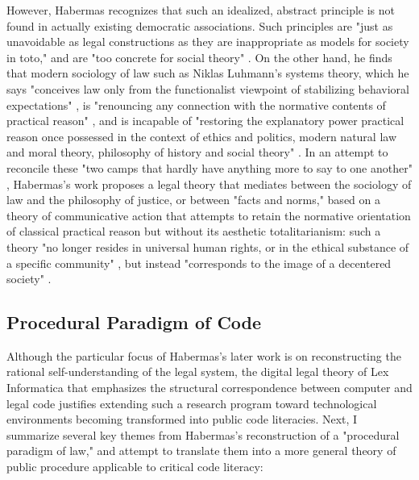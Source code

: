 However, Habermas recognizes that such an idealized, abstract principle is not found in actually existing democratic associations. Such principles are "just as unavoidable as legal constructions as they are inappropriate as models for society in toto," and are "too concrete for social theory" \autocite[80]{Habermas-bfn}. On the other hand, he finds that modern sociology of law such as Niklas Luhmann's systems theory, which he says "conceives law only from the functionalist viewpoint of stabilizing behavioral expectations" \autocite[48]{Habermas-bfn}, is "renouncing any connection with the normative contents of practical reason" \autocite[2]{Habermas-bfn}, and is incapable of "restoring the explanatory power practical reason once possessed in the context of ethics and politics, modern natural law and moral theory, philosophy of history and social theory" \autocite[2]{Habermas-bfn}. In an attempt to reconcile these "two camps that hardly have anything more to say to one another" \autocite[6]{Habermas-bfn}, Habermas's work proposes a legal theory that mediates between the sociology of law and the philosophy of justice, or between "facts and norms," based on a theory of communicative action that attempts to retain the normative orientation of classical practical reason but without its aesthetic totalitarianism: such a theory "no longer resides in universal human rights, or in the ethical substance of a specific community" \autocite[296]{Habermas-bfn}, but instead "corresponds to the image of a decentered society" \autocite[301]{Habermas-bfn}.

\subsection*{Procedural Paradigm of Code}
Although the particular focus of Habermas's later work is on reconstructing the rational self-understanding of the legal system, the digital legal theory of Lex Informatica that emphasizes the structural correspondence between computer and legal code justifies extending such a research program toward technological environments becoming transformed into public code literacies. Next, I summarize several key themes from Habermas's reconstruction of a "procedural paradigm of law," and attempt to translate them into a more general theory of public procedure applicable to critical code literacy:


